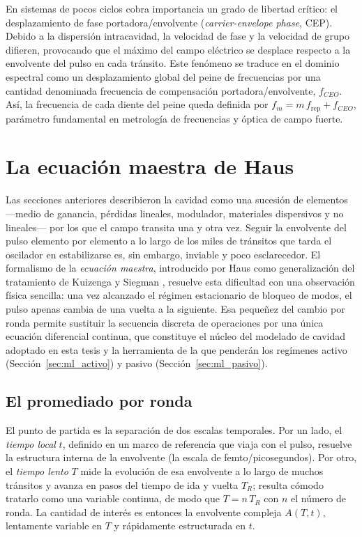En sistemas de pocos ciclos cobra importancia un grado de libertad crítico: el
desplazamiento de fase portadora\-/envolvente (\emph{carrier-envelope phase}, CEP).
Debido a la dispersión intracavidad, la velocidad de fase y la velocidad de grupo
difieren, provocando que el máximo del campo eléctrico se desplace respecto a la
envolvente del pulso en cada tránsito. Este fenómeno se traduce en el dominio
espectral como un desplazamiento global del peine de frecuencias por una cantidad
denominada frecuencia de compensación portadora\-/envolvente, $f_{CEO}$. Así, la
frecuencia de cada diente del peine queda definida por
$f_m = m\,f_{\text{rep}} + f_{CEO}$, parámetro fundamental en metrología de
frecuencias y óptica de campo fuerte.


\section{La ecuación maestra de Haus}
\label{sec:haus}
Las secciones anteriores describieron la cavidad como una sucesión de elementos
—medio de ganancia, pérdidas lineales, modulador, materiales dispersivos y no
lineales— por los que el campo transita una y otra vez. Seguir la envolvente del
pulso elemento por elemento a lo largo de los miles de tránsitos que tarda el
oscilador en estabilizarse es, sin embargo, inviable y poco esclarecedor. El
formalismo de la \emph{ecuación maestra}, introducido por
Haus \cite{Haus1975fast,Haus2000} como generalización del tratamiento de
Kuizenga y Siegman \cite{KuizengaSiegman1970}, resuelve esta dificultad con una
observación física sencilla: una vez alcanzado el régimen estacionario de bloqueo
de modos, el pulso apenas cambia de una vuelta a la siguiente. Esa pequeñez del
cambio por ronda permite sustituir la secuencia discreta de operaciones por una
única ecuación diferencial continua, que constituye el núcleo del modelado de
cavidad adoptado en esta tesis y la herramienta de la que penderán los regímenes
activo (Sección~\ref{sec:ml_activo}) y pasivo (Sección~\ref{sec:ml_pasivo}).
%
%
\subsection{El promediado por ronda}
El punto de partida es la separación de dos escalas temporales. Por un lado, el
\emph{tiempo local} $t$, definido en un marco de referencia que viaja con el
pulso, resuelve la estructura interna de la envolvente (la escala de
femto\-/picosegundos). Por otro, el \emph{tiempo lento} $T$ mide la evolución de
esa envolvente a lo largo de muchos tránsitos y avanza en pasos del tiempo de ida
y vuelta $T_R$; resulta cómodo tratarlo como una variable continua, de modo que
$T = n\,T_R$ con $n$ el número de ronda. La cantidad de interés es entonces la
envolvente compleja $A(T,t)$, lentamente variable en $T$ y rápidamente
estructurada en $t$.
 
